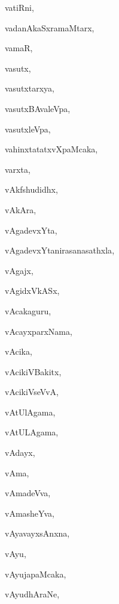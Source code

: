 \begin{multicols}{3}
{\noindent
{vatiRni}, \pageref{vatiRni}

\noindent
{vadanAkaSxramaMtarx}, \pageref{vadanAkaSxramaMtarx}

\noindent
{vamaR}, \pageref{vamaR}

\noindent
{vasutx}, \pageref{vasutx}

\noindent
{vasutxtarxya}, \pageref{vasutxtarxya}

\noindent
{vasutxBAvaleVpa}, \pageref{vasutxBAvaleVpa}

\noindent
{vasutxleVpa}, \pageref{vasutxleVpa}

\noindent
{vahinxtatatxvXpaMcaka}, \pageref{vahinxtatatxvXpaMcaka}

\noindent
{varxta}, \pageref{varxta}

\noindent
{vAkfshudidhx}, \pageref{vAkfshudidhx}

\noindent
{vAkAra}, \pageref{vAkAra}

\noindent
{vAgadevxYta}, \pageref{vAgadevxYta}

\noindent
{vAgadevxYtanirasanasathxla}, \pageref{vAgadevxYtanirasanasathxla}

\noindent
{vAgajx}, \pageref{vAgajx}

\noindent
{vAgidxVkASx}, \pageref{vAgidxVkASx}

\noindent
{vAcakaguru}, \pageref{vAcakaguru}

\noindent
{vAcayxparxNama}, \pageref{vAcayxparxNama}

\noindent
{vAcika}, \pageref{vAcika}

\noindent
{vAcikiVBakitx}, \pageref{vAcikiVBakitx}

\noindent
{vAcikiVseVvA}, \pageref{vAcikiVseVvA}

\noindent
{vAtUlAgama}, \pageref{vAtUlAgama}

\noindent
{vAtULAgama}, \pageref{vAtULAgama}

\noindent
{vAdayx}, \pageref{vAdayx}

\noindent
{vAma}, \pageref{vAma}

\noindent
{vAmadeVva}, \pageref{vAmadeVva}

\noindent
{vAmasheYva}, \pageref{vAmasheYva}

\noindent
{vAyavayxsAnxna}, \pageref{vAyavayxsAnxna}

\noindent
{vAyu}, \pageref{vAyu}

\noindent
{vAyujapaMcaka}, \pageref{vAyujapaMcaka}

\noindent
{vAyudhAraNe}, \pageref{vAyudhAraNe}

}
\end{multicols}
